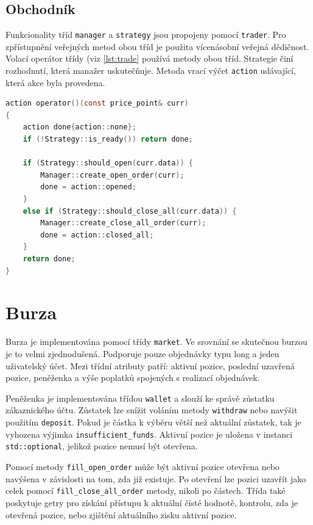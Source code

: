 \subsection{Obchodník}
Funkcionality tříd \texttt{manager} a \texttt{strategy} jsou propojeny pomocí \texttt{trader}.
Pro zpřístupnění veřejných metod obou tříd je použita vícenásobní veřejná dědičnost.
Volací operátor třídy (viz \ref{lst:trade} používá metody obou tříd.
Strategie činí rozhodnutí, která manažer uskutečňuje.
Metoda vrací výčet \texttt{action} udávající, která akce byla provedena.

\begin{lstlisting}[caption={~Implementace volací metody třídy \texttt{bazooka::trader}},label={lst:trade},captionpos=t,abovecaptionskip=-\medskipamount,belowcaptionskip=\medskipamount,language=C]
action operator()(const price_point& curr)
{
    action done{action::none};
    if (!Strategy::is_ready()) return done;

    if (Strategy::should_open(curr.data)) {
        Manager::create_open_order(curr);
        done = action::opened;
    }
    else if (Strategy::should_close_all(curr.data)) {
        Manager::create_close_all_order(curr);
        done = action::closed_all;
    }
    return done;
}
\end{lstlisting}

\section{Burza}
Burza je implementována pomocí třídy \texttt{market}.
Ve srovnání se skutečnou burzou je to velmi zjednodušená.
Podporuje pouze objednávky typu long a jeden uživatelský účet.
Mezi třídní atributy patří: aktivní pozice, poslední uzavřená pozice, peněženka a výše poplatků spojených s realizací objednávek.

Peněženka je implementována třídou \texttt{wallet} a slouží ke správě zůstatku zákaznického účtu.
Zůstatek lze snížit voláním metody \texttt{withdraw} nebo navýšit použitím \texttt{deposit}.
Pokud je částka k výběru větší než aktuální zůstatek, tak je vyhozena výjimka \texttt{insufficient\_funds}.
Aktivní pozice je uložena v instanci \texttt{std::optional}, jelikož pozice nemusí být otevřena.

Pomocí metody \texttt{fill\_open\_order} může být aktivní pozice otevřena nebo navýšena v závislosti na tom, zda již existuje.
Po otevření lze pozici uzavřít jako celek pomocí \texttt{fill\_close\_all\_order} metody, nikoli po částech.
Třída také poskytuje getry pro získání přístupu k aktuální čísté hodnotě, kontrolu, zda je otevřená pozice, nebo zjištění aktuálního zisku aktivní pozice.

